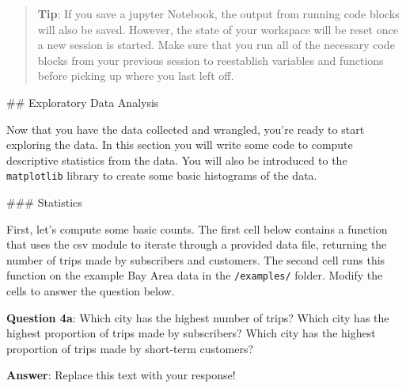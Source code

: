 \documentclass[11pt]{article}
\begin{document}
    \begin{quote}
\textbf{Tip}: If you save a jupyter Notebook, the output from running
code blocks will also be saved. However, the state of your workspace
will be reset once a new session is started. Make sure that you run all
of the necessary code blocks from your previous session to reestablish
variables and functions before picking up where you last left off.
\end{quote}

 \#\# Exploratory Data Analysis

Now that you have the data collected and wrangled, you're ready to start
exploring the data. In this section you will write some code to compute
descriptive statistics from the data. You will also be introduced to the
\texttt{matplotlib} library to create some basic histograms of the data.

 \#\#\# Statistics

First, let's compute some basic counts. The first cell below contains a
function that uses the csv module to iterate through a provided data
file, returning the number of trips made by subscribers and customers.
The second cell runs this function on the example Bay Area data in the
\texttt{/examples/} folder. Modify the cells to answer the question
below.

\textbf{Question 4a}: Which city has the highest number of trips? Which
city has the highest proportion of trips made by subscribers? Which city
has the highest proportion of trips made by short-term customers?

\textbf{Answer}: Replace this text with your response!
\end{document}

